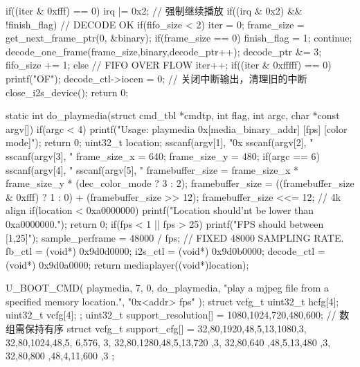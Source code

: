 \begin{CodeBlock}[language=BookC]
{{{{                if((iter & 0xfff) == 0) irq |= 0x2;
                // 强制继续播放
            }
        }
        if((irq & 0x2) && !finish_flag) {
            // DECODE OK
            if(fifo_size < 2) {
                iter = 0;
                frame_size = get_next_frame_ptr(0, &binary);
                if(frame_size == 0) {
                    finish_flag = 1;
                    continue;
                }
                decode_one_frame(frame_size,binary,decode_ptr++);
                decode_ptr &= 3;
                fifo_size += 1;
            } else {
                // FIFO OVER FLOW
                iter++;
                if((iter & 0xfffff) == 0) printf("OF\n");
            }
        }
    }
    decode_ctl->iocen = 0; // 关闭中断输出，清理旧的中断
    close_i2s_device();
    return 0;
}

static int do_playmedia(struct cmd_tbl *cmdtp, int flag, int argc, char *const argv[])
{
	if(argc < 4) {
		printf("Usage: playmedia 0x[media_binary_addr] [fps] [color mode]\n");
		return 0;
	}
	uint32_t location;
	sscanf(argv[1], "0x%
    sscanf(argv[2], "%
    sscanf(argv[3], "%
    frame_size_x = 640;
    frame_size_y = 480;
    if(argc == 6) {
        sscanf(argv[4], "%
        sscanf(argv[5], "%
    }
    framebuffer_size = frame_size_x * frame_size_y * (dec_color_mode ? 3 : 2);
    framebuffer_size = ((framebuffer_size & 0xfff) ? 1 : 0) + (framebuffer_size >> 12);
    framebuffer_size <<= 12; // 4k align
	if(location < 0xa0000000) {
		printf("Location should'nt be lower than 0xa0000000.\n");
		return 0;
	}
    if(fps < 1 || fps > 25) {
        printf("FPS should between [1,25]");
    }
    sample_perframe = 48000 / fps; // FIXED 48000 SAMPLING RATE.
    fb_ctl = (void*) 0x9d0d0000;
    i2s_ctl = (void*) 0x9d0b0000;
    decode_ctl = (void*) 0x9d0a0000;
	return mediaplayer((void*)location);
}

U_BOOT_CMD(
	playmedia,	7,	0,	do_playmedia,
	"play a mjpeg file from a specified memory location.\n",
    "0x<addr> fps"
);
struct vcfg_t{
    uint32_t hcfg[4];
    uint32_t vcfg[4];
};
uint32_t support_resolution[] = {1080,1024,720,480,600}; // 数组需保持有序
struct vcfg_t support_cfg[] = {
    {{32,80,1920,48},{5,13,1080,3}},
    {{32,80,1024,48},{5, 6,576, 3}},
    {{32,80,1280,48},{5,13,720 ,3}},
    {{32,80,640 ,48},{5,13,480 ,3}},
    {{32,80,800 ,48},{4,11,600 ,3}}
};


\end{CodeBlock}
